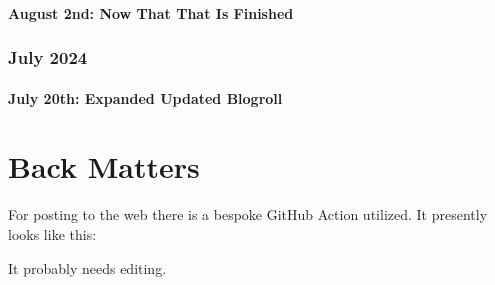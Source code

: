 \documentclass[12pt,letterpaper]{report}
\begin{document}
\subsection{August 2nd: Now That That Is Finished}

\section{July 2024}
\subsection{July 20th: Expanded Updated Blogroll}

\part{Back Matters}
For posting to the web there is a bespoke GitHub Action utilized.  It presently looks like this:



It probably needs editing.
\end{document}
